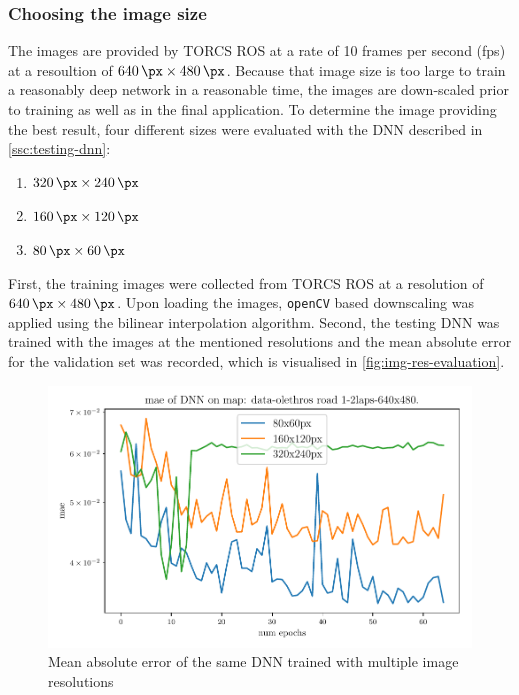 \documentclass[10pt,a4paper,twoside,journal]{IEEEtran}
\begin{document}
\subsubsection{Choosing the image size}
The images are provided by TORCS ROS \cite{mirus_torcs-ros_2017} at a rate of 10 frames per second (fps) at a resoultion of $ \SI{640}{\px} \times \SI{480}{\px} $. Because that image size is too large
to train a reasonably deep network in a reasonable time, the images are down-scaled prior to training as well as in the final application. To determine the image providing the best result, four different sizes were evaluated with the DNN described in \autoref{ssc:testing-dnn}: 
\begin{enumerate}
	\item $ \SI{320}{\px} \times \SI{240}{\px} $
	\item $ \SI{160}{\px} \times \SI{120}{\px} $
	\item $ \SI{80}{\px} \times \SI{60}{\px} $
\end{enumerate}
First, the training images were collected from TORCS ROS at a resolution of $ \SI{640}{\px}\times \SI{480}{\px}$. Upon loading the images, \texttt{openCV} based downscaling was applied using the bilinear interpolation algorithm. Second, the testing DNN was trained with the images at the mentioned resolutions and the mean absolute error 
for the validation set was recorded, which is visualised in \autoref{fig:img-res-evaluation}.
\begin{figure}[ht]
	\centering
	\includegraphics[width=\columnwidth]{attachments/alexnet-val_mae-img_size_compare-09042-12547-22111.pdf}
	\caption{Mean absolute error of the same DNN trained with multiple image resolutions}
	\label{fig:img-res-evaluation}
\end{figure}
\end{document}

